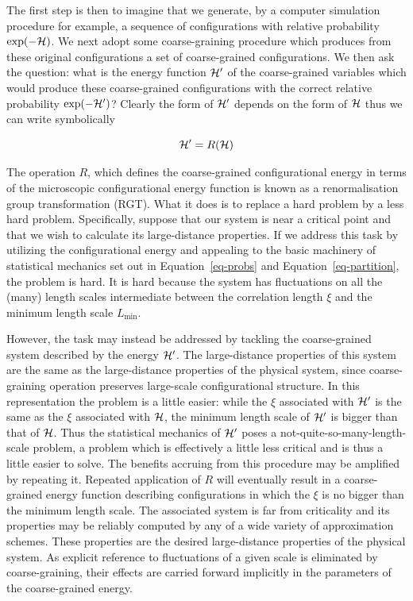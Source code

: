 \documentclass[
  letterpaper,
  enabledeprecatedfontcommands]{report}
\begin{document}
The first step is then to imagine that we generate, by a computer
simulation procedure for example, a sequence of configurations with
relative probability \(\exp(-{\cal H})\). We next adopt some
coarse-graining procedure which produces from these original
configurations a set of coarse-grained configurations. We then ask the
question: what is the energy function \({\cal H}^\prime\) of the
coarse-grained variables which would produce these coarse-grained
configurations with the correct relative probability
\(\exp(-{\cal H}^\prime)\)? Clearly the form of \({\cal H}^\prime\)
depends on the form of \({\cal H}\) thus we can write symbolically

\[{\cal H}^\prime=R({\cal H})\]

The operation \(R\), which defines the coarse-grained configurational
energy in terms of the microscopic configurational energy function is
known as a renormalisation group transformation (RGT). What it does is
to replace a hard problem by a less hard problem. Specifically, suppose
that our system is near a critical point and that we wish to calculate
its large-distance properties. If we address this task by utilizing the
configurational energy and appealing to the basic machinery of
statistical mechanics set out in Equation~\ref{eq-probs} and
Equation~\ref{eq-partition}, the problem is hard. It is hard because the
system has fluctuations on all the (many) length scales intermediate
between the correlation length \(\xi\) and the minimum length scale
\(L_\textrm{min}\).

However, the task may instead be addressed by tackling the
coarse-grained system described by the energy \({\cal H}^\prime\). The
large-distance properties of this system are the same as the
large-distance properties of the physical system, since coarse-graining
operation preserves large-scale configurational structure. In this
representation the problem is a little easier: while the \(\xi\)
associated with \({\cal H}^\prime\) is the same as the \(\xi\)
associated with \({\cal H}\), the minimum length scale of
\({\cal H}^\prime\) is bigger than that of \({\cal H}\). Thus the
statistical mechanics of \({\cal H}^\prime\) poses a
not-quite-so-many-length-scale problem, a problem which is effectively a
little less critical and is thus a little easier to solve. The benefits
accruing from this procedure may be amplified by repeating it. Repeated
application of \(R\) will eventually result in a coarse- grained energy
function describing configurations in which the \(\xi\) is no bigger
than the minimum length scale. The associated system is far from
criticality and its properties may be reliably computed by any of a wide
variety of approximation schemes. These properties are the desired
large-distance properties of the physical system. As explicit reference
to fluctuations of a given scale is eliminated by coarse-graining, their
effects are carried forward implicitly in the parameters of the
coarse-grained energy.
\end{document}
